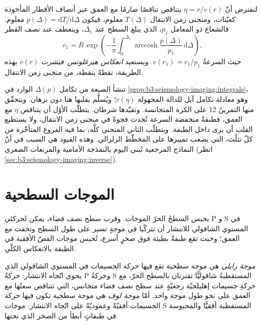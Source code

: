\begin{proposition}\label{prop:b3:seismology-imaging:herglotz}
لنفترض أنّ $\eta = r/v(r)$ يتناقص تناقصًا صارمًا مع العمق عبر أنصاف الأقطار المأخوذة
كعيّنات، ومنحنى زمن الانتقال $T(\Delta)$ معلوم، فيكون $p(\Delta) =
\mathrm dT/\mathrm d\Delta$ معلوم. فالشعاع ذو المعامل $p_1$، الذي
يبلغ السطح عند $\Delta_1$، وينعطف عند نصف القطر
\[
  r_1 = R\,\exp\!\left(-\frac1\pi\int_0^{\Delta_1}
  \operatorname{arccosh}\frac{p(\Delta)}{p_1}\,\mathrm d\Delta\right),
\]
حيث السرعةُ $v(r_1) = r_1/p_1$. ويستعيد \emph{انعكاس هيرغلوتس--فيشرت
} $v(r)$ بهذه الطريقة،
نقطةً بنقطة، من منحنى زمن الانتقال.
\end{proposition}
\admitted

تنشأ الصيغة من تكامل $\Delta(p)$ الوارد في
\cref{prop:b3:seismology-imaging:integrals}، وهو معادلة تكامل آبل
للدالة المجهولة $r(\eta)$؛ ويُسلَّم بقلبها هنا دون برهان.
ويتحقّق منها التمرينُ 12 على الكرة المتجانسة. وتقيّدها شرطان. يتطلّب الأوّل
أن يتناقص $\eta$ مع العمق، فطبقةٌ منخفضة السرعة تُحدث فجوةً في
منحنى زمن الانتقال، ولا يستطيع القلب أن يرى داخل الطبقة. ويتطلّب الثاني
المنحنى كلَّه، بما فيه الفروع المتأخّرة من كلّ تثلّث، التي
يصعب تمييزها على المخطّط الزلزالي. وهذه القيود هي السبب في أنّ النماذج المرجعية تُبنى اليوم
بالنمذجة الأمامية والمربعات الصغرى (انظر \cref{sec:b3:seismology-imaging:inverse}).

\section{الموجات السطحية}

يحبس السطحُ الحرّ الموجات. وقرب سطح نصف فضاء، يمكن لحركتَي P و S
في المستوي الشاقولي للانتشار أن تتركّبا في موجةٍ تسير على طول
السطح وتخفت مع العمق؛ وحيث تقع طبقةٌ بطيئة فوق صخرٍ أسرع،
تُحبس موجات القصّ الأفقية في الطبقة بالانعكاس الكلّي.

\begin{definition}\label{def:b3:seismology-imaging:surface-waves}
\emph{موجة رايلي} هي موجة سطحية تقع فيها حركة الجسيمات
في المستوي الشاقولي الذي يحوي اتّجاه الانتشار:
حركةُ P وحركةُ S المستقطبةُ شاقوليًّا تقترنان بالسطح الحرّ، مع
حركةِ جسيمات إهليلجيّة رجعيّةٍ عند سطح نصف فضاء متجانس،
التي تتناقص سعتُها مع العمق على نحو طول موجة واحد. أمّا \emph{موجة لوف
} هي موجة سطحية تكون فيها حركة الجسيمات أفقيّةً
وعموديّةً على اتّجاه الانتشار: موجات S المستقطبة أفقيًّا والمحبوسة في
طبقاتٍ أبطأ من الصخر الذي تحتها.
\end{definition}

